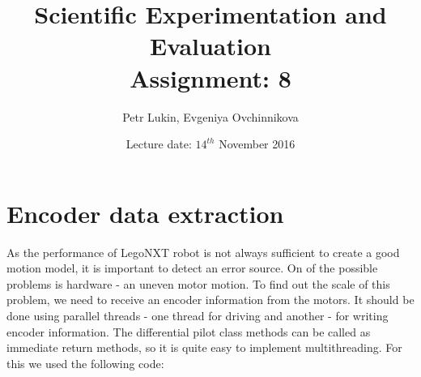\documentclass[a4paper, 12pt]{article}
\title{Scientific Experimentation and Evaluation  \\
				Assignment: 8}
\author{Petr Lukin, Evgeniya Ovchinnikova}
\date{Lecture date: $14^{th}$ November 2016}
\begin{document}



\maketitle

\section{Encoder data extraction}

As the performance of LegoNXT robot is not always sufficient to create a good motion model, it is important to detect an error source. On of the possible problems is hardware - an uneven motor motion. To find out the scale of this problem, we need to receive an encoder information from the motors. It should be done using parallel threads - one thread for driving and another - for writing encoder information. The differential pilot class methods can be called as immediate return methods, so it is quite easy to implement multithreading. For this we used the following code:
\end{document}
